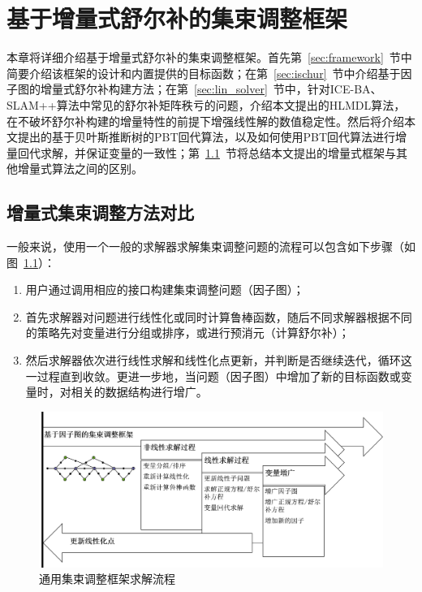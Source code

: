 \chapter{基于增量式舒尔补的集束调整框架}\label{ch:ba}

本章将详细介绍基于增量式舒尔补的集束调整框架。首先第~\ref{sec:framework}~节中简要介绍该框架的设计和内置提供的目标函数；在第~\ref{sec:ischur}~节中介绍基于因子图的增量式舒尔补构建方法；在第~\ref{sec:lin_solver}~节中，针对ICE-BA、SLAM++算法中常见的舒尔补矩阵秩亏的问题，介绍本文提出的HLMDL算法，在不破坏舒尔补构建的增量特性的前提下增强线性解的数值稳定性。然后将介绍本文提出的基于贝叶斯推断树的PBT回代算法，以及如何使用PBT回代算法进行增量回代求解，并保证变量的一致性；第~\ref{sec:comp}~节将总结本文提出的增量式框架与其他增量式算法之间的区别。







\section{增量式集束调整方法对比}\label{sec:comp}

一般来说，使用一个一般的求解器求解集束调整问题的流程可以包含如下步骤（如图~\ref{fig:pipeline}）：
\begin{enumerate}
    \item 用户通过调用相应的接口构建集束调整问题（因子图）；
    \item 首先求解器对问题进行线性化或同时计算鲁棒函数，随后不同求解器根据不同的策略先对变量进行分组或排序，或进行预消元（计算舒尔补）；
    \item 然后求解器依次进行线性求解和线性化点更新，并判断是否继续迭代，循环这一过程直到收敛。更进一步地，当问题（因子图）中增加了新的目标函数或变量时，对相关的数据结构进行增广。
\end{enumerate}

\begin{figure}[htb!]
    \centering
    \includegraphics[scale=.5]{Pictures/framework.png}
    \caption{通用集束调整框架求解流程}
    \label{fig:pipeline}
\end{figure}

